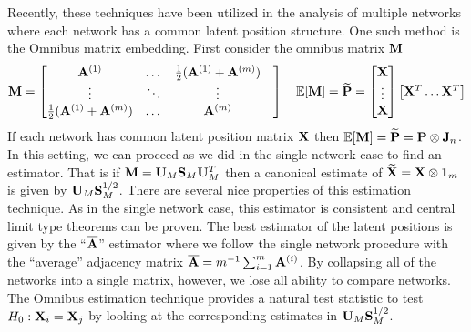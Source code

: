 \documentclass[12pt]{article}
\begin{document}
Recently, these techniques have been utilized in the analysis of multiple networks where each network has a common latent position structure. One such method is the Omnibus matrix embedding. First consider the omnibus matrix $\mathbf{M}$
\begin{equation}
\mathbf{M} = \begin{bmatrix}
    \mathbf{A}^{(1)} & \dots & \frac{1}{2}(\mathbf{A}^{(1)} + \mathbf{A}^{(m)})\\
    \vdots & \ddots & \vdots\\
     \frac{1}{2}(\mathbf{A}^{(1)} + \mathbf{A}^{(m)})& \dots & \mathbf{A}^{(m)}&\\
\end{bmatrix}
\quad 
{\mathbb{E}}[\mathbf{M}] = \mathbf{\widetilde{P}} = \begin{bmatrix}
    \mathbf{X}\\
    \vdots\\
    \mathbf{X}
    \end{bmatrix}
    \begin{bmatrix}
    \mathbf{X}^T\dots\mathbf{X}^T\end{bmatrix}
\end{equation}
If each network has common latent position matrix $\mathbf{X}$ then ${\mathbb{E}}[\mathbf{M}] = \widetilde{\mathbf{P}} = \mathbf{P}\otimes \mathbf{J}_n$. In this setting, we can proceed as we did in the single network case to find an estimator. That is if $\mathbf{M} = \mathbf{U}_M\mathbf{S}_M\mathbf{U}_M^T$ then a canonical estimate of $\widetilde{\mathbf{X}} = \mathbf{X}\otimes \mathbf{1}_m$ is given by $\mathbf{U}_M\mathbf{S}_M^{1/2}$. There are several nice properties of this estimation technique. As in the single network case, this estimator is consistent and central limit type theorems can be proven. The best estimator of the latent positions is given by the ``$\overline{\mathbf{A}}$'' estimator where we follow the single network procedure with the ``average'' adjacency matrix $\overline{\mathbf{A}} = m^{-1}\sum_{i=1}^m\mathbf{A}^{(i)}$. By collapsing all of the networks into a single matrix, however, we lose all ability to compare networks. The Omnibus estimation technique provides a natural test statistic to test $H_0: \mathbf{X}_i = \mathbf{X}_j$ by looking at the corresponding estimates in $\mathbf{U}_M\mathbf{S}_M^{1/2}$. 
\end{document}
